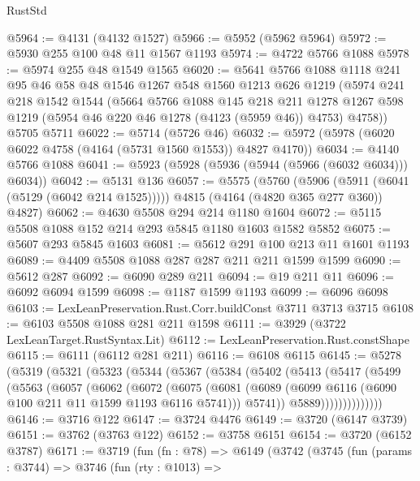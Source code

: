 \begin{lexlean}{RustStd}
\begin{coremodule}
@5964 := @4131 (@4132 @1527)
@5966 := @5952 (@5962 @5964)
@5972 := @5930 @255 @100 @48 @11 @1567 @1193
@5974 := @4722 @5766 @1088
@5978 := @5974 @255 @48 @1549 @1565
@6020 := @5641
    @5766
    @1088
    @1118
    @241
    @95
    @46
    @58
    @48
    @1546
    @1267
    @548
    @1560
    @1213
    @626
    @1219
    (@5974
      @241
      @218
      @1542
      @1544
      (@5664
        @5766
        @1088
        @145
        @218
        @211
        @1278
        @1267
        @598
        @1219
        (@5954 @46 @220 @46 @1278 (@4123 (@5959 @46)) @4753)
        @4758))
    @5705
    @5711
@6022 := @5714 (@5726 @46)
@6032 := @5972 (@5978 (@6020 @6022 @4758 (@4164 (@5731 @1560 @1553)) @4827 @4170))
@6034 := @4140 @5766 @1088
@6041 := @5923 (@5928 (@5936 (@5944 (@5966 (@6032 @6034))) @6034))
@6042 := @5131 @136
@6057 := @5575
    (@5760
      (@5906 (@5911 (@6041 (@5129 (@6042 @214 @1525)))))
      @4815
      (@4164 (@4820 @365 @277 @360))
      @4827)
@6062 := @4630 @5508 @294 @214 @1180 @1604
@6072 := @5115 @5508 @1088 @152 @214 @293 @5845 @1180 @1603 @1582 @5852
@6075 := @5607 @293 @5845 @1603
@6081 := @5612 @291 @100 @213 @11 @1601 @1193
@6089 := @4409 @5508 @1088 @287 @287 @211 @211 @1599 @1599
@6090 := @5612 @287
@6092 := @6090 @289 @211
@6094 := @19 @211 @11
@6096 := @6092 @6094 @1599
@6098 := @1187 @1599 @1193
@6099 := @6096 @6098
@6103 := LexLeanPreservation.Rust.Corr.buildConst @3711 @3713 @3715
@6108 := @6103 @5508 @1088 @281 @211 @1598
@6111 := @3929 (@3722 LexLeanTarget.RustSyntax.Lit)
@6112 := LexLeanPreservation.Rust.constShape
@6115 := @6111 (@6112 @281 @211)
@6116 := @6108 @6115
@6145 := @5278
    (@5319
      (@5321
        (@5323
          (@5344
            (@5367
              (@5384
                (@5402
                  (@5413
                    (@5417
                      (@5499
                        (@5563
                          (@6057
                            (@6062
                              (@6072
                                (@6075
                                  (@6081
                                    (@6089
                                      (@6099 @6116 (@6090 @100 @211 @11 @1599 @1193 @6116 @5741)))
                                    @5741))
                                @5889))))))))))))))
@6146 := @3716 @122
@6147 := @3724 @4476
@6149 := @3720 (@6147 @3739)
@6151 := @3762 (@3763 @122)
@6152 := @3758 @6151
@6154 := @3720 (@6152 @3787)
@6171 := @3719
    (fun (fn : @78) =>
    @6149
      (@3742
        (@3745
          (fun (params : @3744) =>
          @3746
            (fun (rty : @1013) =>

\end{coremodule}
\end{lexlean}
